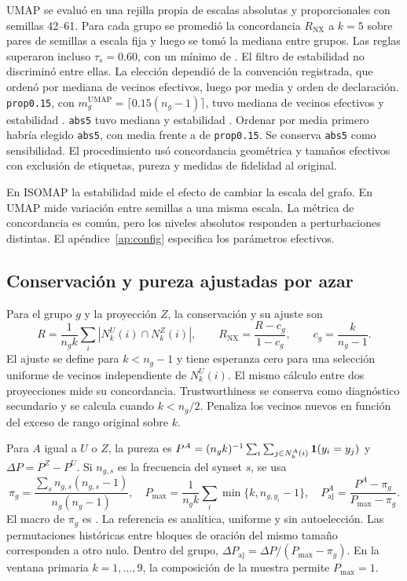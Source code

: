 UMAP se evaluó en una rejilla propia de escalas absolutas y proporcionales con semillas 42–61. Para cada grupo se promedió la concordancia $R_{\mathrm{NX}}$ a $k=5$ sobre pares de semillas a escala fija y luego se tomó la mediana entre grupos. Las  reglas superaron incluso $\tau_s=0.60$, con un mínimo de . El filtro de estabilidad no discriminó entre ellas. La elección dependió de la convención registrada, que ordenó por mediana de vecinos efectivos, luego por media y orden de declaración. \texttt{prop0.15}, con $m_g^{\mathrm{UMAP}}=\lceil0.15(n_g-1)\rceil$, tuvo mediana  de vecinos efectivos y estabilidad . \texttt{abs5} tuvo mediana  y estabilidad . Ordenar por media primero habría elegido \texttt{abs5}, con media  frente a  de \texttt{prop0.15}. Se conserva \texttt{abs5} como sensibilidad. El procedimiento usó concordancia geométrica y tamaños efectivos con exclusión de etiquetas, pureza y medidas de fidelidad al original.

En ISOMAP la estabilidad mide el efecto de cambiar la escala del grafo. En UMAP mide variación entre semillas a una misma escala. La métrica de concordancia es común, pero los niveles absolutos responden a perturbaciones distintas. El apéndice~\ref{ap:config} especifica los parámetros efectivos.

\subsection{Conservación y pureza ajustadas por azar}
Para el grupo $g$ y la proyección $Z$, la conservación y su ajuste son
\begin{equation}\label{eq:rnx}
 R=\frac{1}{n_g k}\sum_i |N_k^U(i)\cap N_k^Z(i)|,
 \qquad R_{\mathrm{NX}}=\frac{R-c_g}{1-c_g},
 \qquad c_g=\frac{k}{n_g-1}.
\end{equation}
El ajuste se define para $k<n_g-1$ y tiene esperanza cero para una selección uniforme de vecinos independiente de $N_k^U(i)$. El mismo cálculo entre dos proyecciones mide su concordancia. Trustworthiness se conserva como diagnóstico secundario y se calcula cuando $k<n_g/2$. Penaliza los vecinos nuevos en función del exceso de rango original sobre $k$.

Para $A$ igual a $U$ o $Z$, la pureza es $P^A=(n_g k)^{-1}\sum_i\sum_{j\in N_k^A(i)}\mathbf{1}(y_i=y_j)$ y $\Delta P=P^Z-P^U$. Si $n_{g,s}$ es la frecuencia del synset $s$, se usa
\[
 \pi_g=\frac{\sum_s n_{g,s}(n_{g,s}-1)}{n_g(n_g-1)},\quad
 P_{\max}=\frac{1}{n_g k}\sum_i\min\{k,n_{g,y_i}-1\},\quad
 P_{\mathrm{aj}}^A=\frac{P^A-\pi_g}{P_{\max}-\pi_g}.
\]
El macro de $\pi_g$ es . La referencia es analítica, uniforme y sin autoelección. Las permutaciones históricas entre bloques de oración del mismo tamaño corresponden a otro nulo. Dentro del grupo, $\Delta P_{\mathrm{aj}}=\Delta P/(P_{\max}-\pi_g)$. En la ventana primaria $k=1,\ldots,9$, la composición de la muestra permite $P_{\max}=1$.

